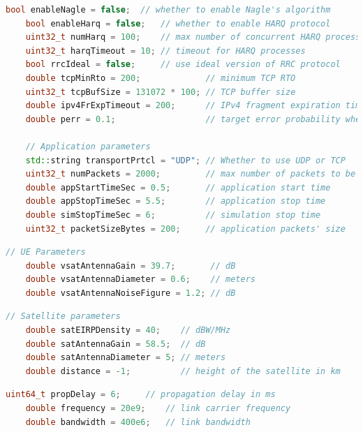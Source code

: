 \begin{lstlisting}[language=C++, caption=Application and UE configuration parameters, label=code:ue_parameters]
    bool enableNagle = false;  // whether to enable Nagle's algorithm
    bool enableHarq = false;   // whether to enable HARQ protocol
    uint32_t numHarq = 100;    // max number of concurrent HARQ processes
    uint32_t harqTimeout = 10; // timeout for HARQ processes
    bool rrcIdeal = false;     // use ideal version of RRC protocol
    double tcpMinRto = 200;             // minimum TCP RTO
    uint32_t tcpBufSize = 131072 * 100; // TCP buffer size
    double ipv4FrExpTimeout = 200;      // IPv4 fragment expiration timeout
    double perr = 0.1;                  // target error probability when transmitting PHY-level packets

    // Application parameters
    std::string transportPrtcl = "UDP"; // Whether to use UDP or TCP
    uint32_t numPackets = 2000;         // max number of packets to be sent
    double appStartTimeSec = 0.5;       // application start time
    double appStopTimeSec = 5.5;        // application stop time
    double simStopTimeSec = 6;          // simulation stop time
    uint32_t packetSizeBytes = 200;     // application packets' size
\end{lstlisting}

\begin{lstlisting}[language=C++, caption=UE antenna parameters, label=code:tx_parameters]
    // UE Parameters
    double vsatAntennaGain = 39.7;       // dB
    double vsatAntennaDiameter = 0.6;    // meters
    double vsatAntennaNoiseFigure = 1.2; // dB 
\end{lstlisting}

\begin{lstlisting}[language=C++, caption=Satellite antenna parameters, label=code:sat_parameters]
    // Satellite parameters
    double satEIRPDensity = 40;    // dBW/MHz
    double satAntennaGain = 58.5;  // dB
    double satAntennaDiameter = 5; // meters
    double distance = -1;          // height of the satellite in km
\end{lstlisting}

\begin{lstlisting}[language=C++, caption=Non-terrestrial link parameters, label=code:link_parameters]
    uint64_t propDelay = 6;     // propagation delay in ms
    double frequency = 20e9;    // link carrier frequency
    double bandwidth = 400e6;   // link bandwidth
\end{lstlisting}

